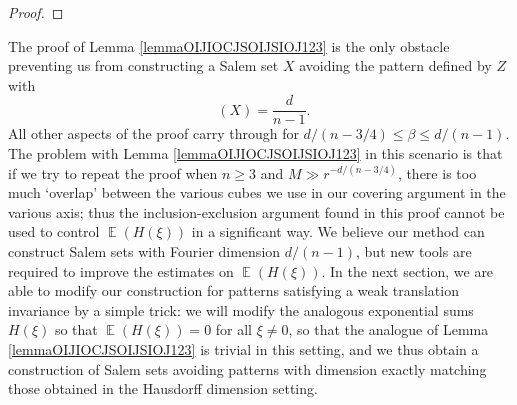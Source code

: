 \documentclass[dvipsnames,letterpaper,12pt]{article}
\numberwithin{equation}{section}
\DeclareMathOperator{\fordim}{\dim_{\mathbb{F}}}
\DeclareMathOperator{\ZZ}{\mathbb{Z}}
\DeclareMathOperator{\TT}{\mathbb{T}}
\numberwithin{theorem}{section}
\DeclareMathOperator{\EE}{\mathbb{E}}
\begin{document}
\begin{proof}
\end{proof}

The proof of Lemma \ref{lemmaOIJIOCJSOIJSIOJ123} is the only obstacle preventing us from constructing a Salem set $X$ avoiding the pattern defined by $Z$ with
%
\[ \fordim(X) = \frac{d}{n-1}. \]
%
All other aspects of the proof carry through for $d/(n-3/4) \leq \beta \leq d/(n-1)$. The problem with Lemma \ref{lemmaOIJIOCJSOIJSIOJ123} in this scenario is that if we try to repeat the proof when $n \geq 3$ and $M \gg r^{-d/(n-3/4)}$, there is too much `overlap' between the various cubes we use in our covering argument in the various axis; thus the inclusion-exclusion argument found in this proof cannot be used to control $\EE(H(\xi))$ in a significant way. We believe our method can construct Salem sets with Fourier dimension $d/(n-1)$, but new tools are required to improve the estimates on $\EE(H(\xi))$. In the next section, we are able to modify our construction for patterns satisfying a weak translation invariance by a simple trick: we will modify the analogous exponential sums $H(\xi)$ so that $\EE(H(\xi)) = 0$ for all $\xi \neq 0$, so that the analogue of Lemma \ref{lemmaOIJIOCJSOIJSIOJ123} is trivial in this setting, and we thus obtain a construction of Salem sets avoiding patterns with dimension exactly matching those obtained in the Hausdorff dimension setting.
\end{document}
